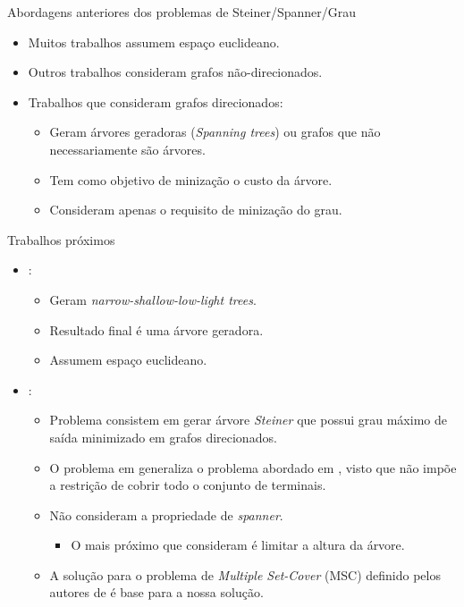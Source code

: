 \documentclass[10pt]{beamer}
\begin{document}
\begin{frame}{Abordagens anteriores dos problemas de Steiner/Spanner/Grau}
  \begin{itemize}
  \item Muitos trabalhos assumem espaço euclideano.
  \item Outros trabalhos consideram grafos não-direcionados.
  \item Trabalhos que consideram grafos direcionados:
  \begin{itemize}
    \item Geram árvores geradoras (\emph{Spanning trees}) ou grafos que não necessariamente são árvores.
    \item Tem como objetivo de minização o custo da árvore.
    \item Consideram apenas o requisito de minização do grau.
  \end{itemize}
  \end{itemize}
\end{frame}

\begin{frame}{Trabalhos próximos}
  \begin{itemize}
    \item \cite{Elkin2009,Elkin2011}:
    \begin{itemize}
      \item Geram \emph{narrow-shallow-low-light trees}.
      \item Resultado final é uma árvore geradora.
      \item Assumem espaço euclideano.
    \end{itemize}
    \item \cite{Elkin2006,Khandekar2011}:
    \begin{itemize}
      \item Problema consistem em gerar árvore \emph{Steiner} que possui grau máximo de saída minimizado em grafos direcionados.
      \item O problema em \cite{Khandekar2011} generaliza o problema abordado em \cite{Elkin2006}, visto que não impõe a restrição de cobrir todo o conjunto de terminais.
      \item Não consideram a propriedade de \emph{spanner}.
      \begin{itemize}
	\item O mais próximo que consideram é limitar a altura da árvore.
      \end{itemize}
      \item A solução para o problema de \emph{Multiple Set-Cover} (MSC) definido pelos autores de \cite{Elkin2006} é base para a nossa solução.
    \end{itemize}
  \end{itemize}
\end{frame}
\end{document}
